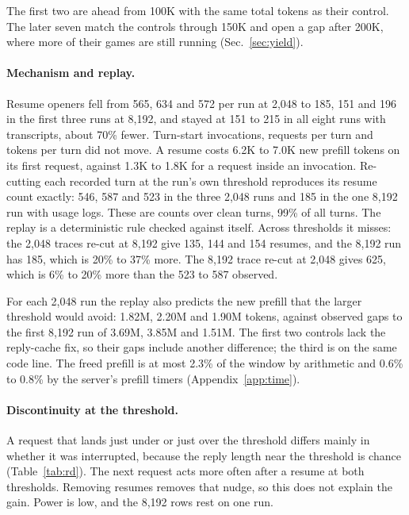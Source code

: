 The first two are ahead from 100K with the same total tokens as their control. The later seven match the controls through 150K and open a gap after 200K, where more of their games are still running (Sec.~\ref{sec:yield}). %

\paragraph{Mechanism and replay.}
Resume openers fell from 565, 634 and 572 per run at 2,048 to 185, 151 and 196 in the first three runs at 8,192, and stayed at 151 to 215 in all eight runs with transcripts, about 70\% fewer. Turn-start invocations, requests per turn and tokens per turn did not move. %
A resume costs 6.2K to 7.0K new prefill tokens on its first request, against 1.3K to 1.8K for a request inside an invocation. %
Re-cutting each recorded turn at the run's own threshold reproduces its resume count exactly: 546, 587 and 523 in the three 2,048 runs and 185 in the one 8,192 run with usage logs. These are counts over clean turns, 99\% of all turns. %
The replay is a deterministic rule checked against itself. Across thresholds it misses: the 2,048 traces re-cut at 8,192 give 135, 144 and 154 resumes, and the 8,192 run has 185, which is 20\% to 37\% more. The 8,192 trace re-cut at 2,048 gives 625, which is 6\% to 20\% more than the 523 to 587 observed. %



For each 2,048 run the replay also predicts the new prefill that the larger threshold would avoid: 1.82M, 2.20M and 1.90M tokens, against observed gaps to the first 8,192 run of 3.69M, 3.85M and 1.51M. The first two controls lack the reply-cache fix, so their gaps include another difference; the third is on the same code line. %
The freed prefill is at most 2.3\% of the window by arithmetic and 0.6\% to 0.8\% by the server's prefill timers (Appendix~\ref{app:time}). %

\paragraph{Discontinuity at the threshold.}
A request that lands just under or just over the threshold differs mainly in whether it was interrupted, because the reply length near the threshold is chance (Table~\ref{tab:rd}).
The next request acts more often after a resume at both thresholds. %
Removing resumes removes that nudge, so this does not explain the gain. Power is low, and the 8,192 rows rest on one run. %

